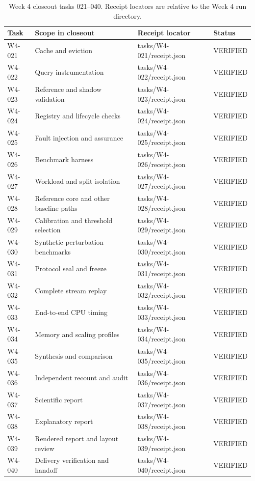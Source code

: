\begin{table}[H]
\caption{Week 4 closeout tasks 021--040. Receipt locators are relative to the Week 4 run directory.}
\centering\small
\begin{tabularx}{\textwidth}{@{}lYYl@{}}\toprule
Task & Scope in closeout & Receipt locator & Status\\
\midrule
W4-021 & Cache and eviction & tasks/W4-021/receipt.json & VERIFIED\\
W4-022 & Query instrumentation & tasks/W4-022/receipt.json & VERIFIED\\
W4-023 & Reference and shadow validation & tasks/W4-023/receipt.json & VERIFIED\\
W4-024 & Registry and lifecycle checks & tasks/W4-024/receipt.json & VERIFIED\\
W4-025 & Fault injection and assurance & tasks/W4-025/receipt.json & VERIFIED\\
W4-026 & Benchmark harness & tasks/W4-026/receipt.json & VERIFIED\\
W4-027 & Workload and split isolation & tasks/W4-027/receipt.json & VERIFIED\\
W4-028 & Reference core and other baseline paths & tasks/W4-028/receipt.json & VERIFIED\\
W4-029 & Calibration and threshold selection & tasks/W4-029/receipt.json & VERIFIED\\
W4-030 & Synthetic perturbation benchmarks & tasks/W4-030/receipt.json & VERIFIED\\
W4-031 & Protocol seal and freeze & tasks/W4-031/receipt.json & VERIFIED\\
W4-032 & Complete stream replay & tasks/W4-032/receipt.json & VERIFIED\\
W4-033 & End-to-end CPU timing & tasks/W4-033/receipt.json & VERIFIED\\
W4-034 & Memory and scaling profiles & tasks/W4-034/receipt.json & VERIFIED\\
W4-035 & Synthesis and comparison & tasks/W4-035/receipt.json & VERIFIED\\
W4-036 & Independent recount and audit & tasks/W4-036/receipt.json & VERIFIED\\
W4-037 & Scientific report & tasks/W4-037/receipt.json & VERIFIED\\
W4-038 & Explanatory report & tasks/W4-038/receipt.json & VERIFIED\\
W4-039 & Rendered report and layout review & tasks/W4-039/receipt.json & VERIFIED\\
W4-040 & Delivery verification and handoff & tasks/W4-040/receipt.json & VERIFIED\\
\bottomrule\end{tabularx}
\end{table}
